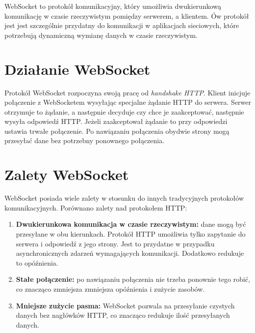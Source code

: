  WebSocket \cite{WebSocket} to protokół komunikacyjny, który umożliwia dwukierunkową komunikację w czasie rzeczywistym pomiędzy serwerem, a klientem. Ów protokół jest jest szczególnie przydatny do komunikacji w aplikacjach sieciowych, które potrzebują dynamiczną wymianę danych w czasie rzeczywistym.
\section{Działanie WebSocket}
Protokół WebSocket rozpoczyna swoją pracę od \textit{handshake HTTP}. Klient inicjuje połączenie z WebSocketem wysyłając specjalne żądanie HTTP do serwera. Serwer otrzymuje to żądanie, a następnie decyduje czy chce je zaakceptować, następnie wysyła odpowiedź HTTP. Jeżeli zaakceptował żądanie to przy odpowiedzi ustawia trwałe połączenie. Po nawiązaniu połączenia obydwie strony mogą przesyłać dane bez potrzebny ponownego połączenia.

\section{Zalety WebSocket}
WebSocket posiada wiele zalety w stosunku do innych tradycyjnych protokołów komunikacyjnych. Porównano zalety nad protokołem HTTP:
\begin{enumerate}
    \item \textbf{Dwukierunkowa komunikacja w czasie rzeczywistym:} dane mogą być przesyłane w obu kierunkach. Protokół HTTP umożliwia tylko zapytanie do serwera i odpowiedź z jego strony. Jest to przydatne w przypadku asynchronicznych zdarzeń wymagających komunikacji. Dodatkowo redukuje to opóźnienia.
    \item \textbf{Stałe połączenie:} po nawiązaniu połączenia nie trzeba ponownie tego robić, co znacząco zmniejsza zmniejsza opóźnienia i zużycie zasobów.
    \item \textbf{Mniejsze zużycie pasma:} WebSocket pozwala na przesyłanie czystych danych bez nagłówków HTTP, co znacząco redukuje ilość przesyłanych danych.
\end{enumerate}